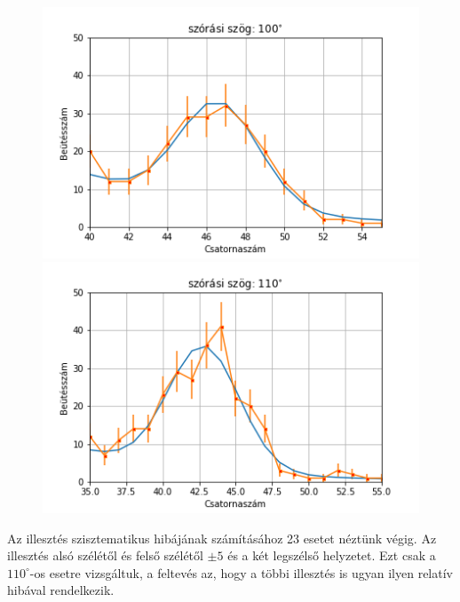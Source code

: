 \documentclass[a4paper,12pt]{article}
\begin{document}
\begin{figure}[!htb]
\begin{minipage}{.49\textwidth}
    \end{minipage}
    \begin{minipage}{.49\textwidth}
        \centering
        \includegraphics[width=1.\linewidth]{../plots/withbackground/100_1113fit.png}
    \end{minipage}
    \begin{minipage}{.49\textwidth}
        \centering
        \includegraphics[width=1.\linewidth]{../plots/withbackground/110_1098fit.png}
    \end{minipage}
\end{figure}

\newpage

\par Az illesztés szisztematikus hibájának számításához 23 esetet néztünk végig. Az illesztés alsó szélétől és felső szélétől $\pm 5$ és a két legszélső helyzetet. Ezt csak a $110^{\circ}$-os esetre vizsgáltuk, a feltevés az, hogy a többi illesztés is ugyan ilyen relatív hibával rendelkezik.
\end{document}
